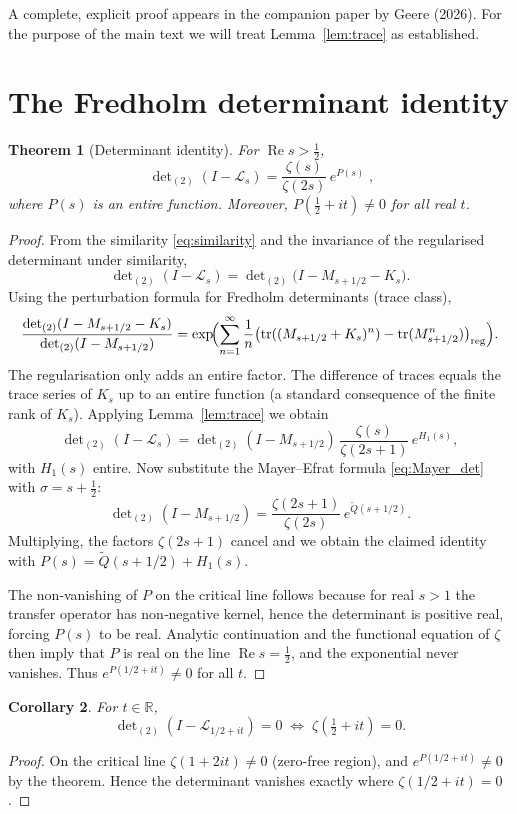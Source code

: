 \documentclass[12pt,a4paper]{article}
\newtheorem{theorem}{Theorem}[section]
\newtheorem{corollary}[theorem]{Corollary}
\theoremstyle{remark}
\begin{document}
A complete, explicit proof appears in the companion paper by Geere (2026).
For the purpose of the main text we will treat Lemma~\ref{lem:trace} as established.

\section{The Fredholm determinant identity}
\label{sec:det_identity}

\begin{theorem}[Determinant identity]
For $\operatorname{Re}s>\frac12$,
\[
\boxed{\;\det\nolimits_{(2)}(I-\mathcal L_s)=\frac{\zeta(s)}{\zeta(2s)}\,e^{P(s)}\;},
\]
where $P(s)$ is an entire function.
Moreover, $P(\frac12+it)\neq0$ for all real $t$.
\end{theorem}
\begin{proof}
From the similarity \eqref{eq:similarity} and the invariance of the regularised determinant under similarity,
\[
\det\nolimits_{(2)}(I-\mathcal L_s)=\det\nolimits_{(2)}\bigl(I-M_{s+1/2}-K_s\bigr).
\]
Using the perturbation formula for Fredholm determinants (trace class),
\[
\frac{\det_{(2)}(I-M_{s+1/2}-K_s)}{\det_{(2)}(I-M_{s+1/2})}
= \exp\!\Bigl(\sum_{n=1}^\infty\frac1n\bigl(\operatorname{tr}((M_{s+1/2}+K_s)^n)-\operatorname{tr}(M_{s+1/2}^n)\bigr)_{\text{reg}}\Bigr).
\]
The regularisation only adds an entire factor.
The difference of traces equals the trace series of $K_s$ up to an entire function (a standard consequence of the finite rank of $K_s$).
Applying Lemma~\ref{lem:trace} we obtain
\[
\det\nolimits_{(2)}(I-\mathcal L_s)=\det\nolimits_{(2)}(I-M_{s+1/2})\,
\frac{\zeta(s)}{\zeta(2s+1)}\,e^{H_1(s)},
\]
with $H_1(s)$ entire.
Now substitute the Mayer–Efrat formula \eqref{eq:Mayer_det} with $\sigma=s+\frac12$:
\[
\det\nolimits_{(2)}(I-M_{s+1/2})=\frac{\zeta(2s+1)}{\zeta(2s)}\,e^{\widetilde Q(s+1/2)}.
\]
Multiplying, the factors $\zeta(2s+1)$ cancel and we obtain the claimed identity with
$P(s)=\widetilde Q(s+1/2)+H_1(s)$.

The non‑vanishing of $P$ on the critical line follows because for real $s>1$ the transfer operator has non‑negative kernel, hence the determinant is positive real, forcing $P(s)$ to be real.
Analytic continuation and the functional equation of $\zeta$ then imply that $P$ is real on the line $\operatorname{Re}s=\frac12$,
and the exponential never vanishes.
Thus $e^{P(1/2+it)}\neq0$ for all $t$.
\end{proof}

\begin{corollary}\label{cor:zeros}
For $t\in\mathbb R$,
\[
\det\nolimits_{(2)}(I-\mathcal L_{1/2+it})=0 \;\Longleftrightarrow\; \zeta(\tfrac12+it)=0.
\]
\end{corollary}
\begin{proof}
On the critical line $\zeta(1+2it)\neq0$ (zero‑free region), and $e^{P(1/2+it)}\neq0$ by the theorem.
Hence the determinant vanishes exactly where $\zeta(1/2+it)=0$.
\end{proof}
\end{document}
